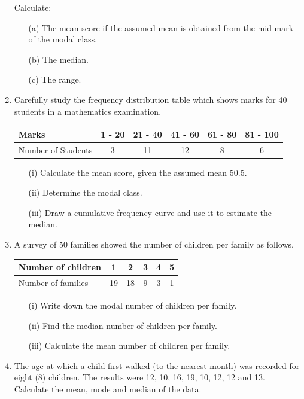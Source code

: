 \begin{enumerate}
	Calculate:
	\begin{itemize}
	\item[(a)] The mean score if the assumed mean is obtained from the mid mark of the modal class.
	\item[(b)] The median.
	\item[(c)] The range.
	\end{itemize}
	
	\item Carefully study the frequency distribution table which shows marks for 40 students in a mathematics examination.\\
	
	\begin{tabular}{|l|c|c|c|c|c|} \hline
	Marks & 1 - 20&21 - 40&41 - 60&61 - 80&81 - 100\\ \hline
	Number of Students&3&11&12&8&6\\ \hline	
	\end{tabular}
	
	\begin{itemize}
	\item[(i)] Calculate the mean score, given the assumed mean 50.5.
	\item[(ii)] Determine the modal class.
	\item[(iii)] Draw a cumulative frequency curve and use it to estimate the median.
	\end{itemize}
	
	\item A survey of 50 families showed the number of children per family as follows.\\
	
	\begin{tabular}{|l|c|c|c|c|c|} \hline
	Number of children&1&2&3&4&5 \\ \hline
	Number of families&19&18&9&3&1 \\ \hline	
	\end{tabular}
	
	\begin{itemize}
	\item[(i)] Write down the modal number of children per family.
	\item[(ii)] Find the median number of children per family.
	\item[(iii)] Calculate the mean number of children per family.
	\end{itemize}
	
	\item The age at which a child first walked (to the nearest month) was recorded for eight (8) children. The results were 12, 10, 16, 19, 10, 12, 12 and 13. Calculate the mean, mode and median of the data.
	

\end{enumerate}
